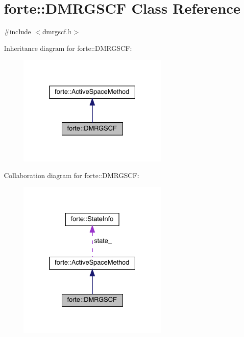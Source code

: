 \hypertarget{classforte_1_1_d_m_r_g_s_c_f}{}\section{forte\+:\+:D\+M\+R\+G\+S\+CF Class Reference}
\label{classforte_1_1_d_m_r_g_s_c_f}


{\ttfamily \#include $<$dmrgscf.\+h$>$}



Inheritance diagram for forte\+:\+:D\+M\+R\+G\+S\+CF\+:
\nopagebreak
\begin{figure}[H]
\begin{center}
\leavevmode
\includegraphics[width=211pt]{classforte_1_1_d_m_r_g_s_c_f__inherit__graph}
\end{center}
\end{figure}


Collaboration diagram for forte\+:\+:D\+M\+R\+G\+S\+CF\+:
\nopagebreak
\begin{figure}[H]
\begin{center}
\leavevmode
\includegraphics[width=211pt]{classforte_1_1_d_m_r_g_s_c_f__coll__graph}
\end{center}
\end{figure}
